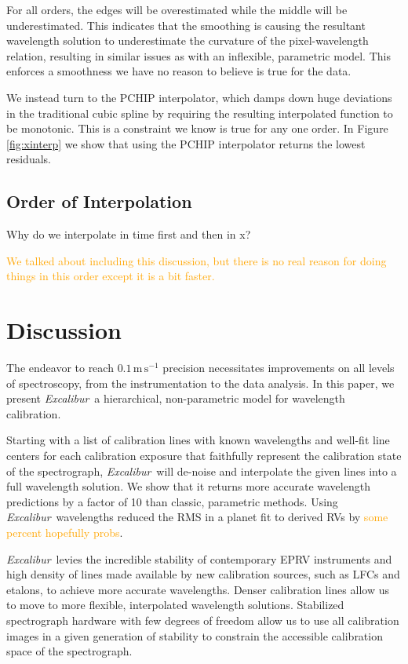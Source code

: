 \documentclass[twocolumn]{aastex63}
\newcommand{\lz}[1]{\textcolor{orange}{#1}}
\newcommand{\project}[1]{\textsl{#1}}
\newcommand{\name}{\project{Excalibur}}
\newcommand{\mps}{\mathrm{m\,s^{-1}}}
\begin{document}
For all orders, the edges will be overestimated while the middle will be underestimated.  This indicates that the smoothing is causing the resultant wavelength solution to underestimate the curvature of the pixel-wavelength relation, resulting in similar issues as with an inflexible, parametric model.  This enforces a smoothness we have no reason to believe is true for the data.

We instead turn to the PCHIP interpolator, which damps down huge deviations in the traditional cubic spline by requiring the resulting interpolated function to be monotonic.  This is a constraint we know is true for any one order.  In Figure \ref{fig:xinterp} we show that using the PCHIP interpolator returns the lowest residuals.

\subsection{Order of Interpolation}
Why do we interpolate in time first and then in x?

\lz{We talked about including this discussion, but there is no real reason for doing things in this order except it is a bit faster.}


\section{Discussion} \label{sec:discussion}
The endeavor to reach $0.1\,\mps$ precision necessitates improvements on all levels of spectroscopy, from the instrumentation to the data analysis.  In this paper, we present \name\, a hierarchical, non-parametric model for wavelength calibration.  

Starting with a list of calibration lines with known wavelengths and well-fit line centers for each calibration exposure that faithfully represent the calibration state of the spectrograph, \name\ will de-noise and interpolate the given lines into a full wavelength solution.  We show that it returns more accurate wavelength predictions by a factor of 10 than classic, parametric methods.  Using \name\ wavelengths reduced the RMS in a planet fit to derived RVs by \lz{some percent hopefully probs}.

\name\ levies the incredible stability of contemporary EPRV instruments and high density of lines made available by new calibration sources, such as LFCs and etalons, to achieve more accurate wavelengths.  Denser calibration lines allow us to move to more flexible, interpolated wavelength solutions.  Stabilized spectrograph hardware with few degrees of freedom allow us to use all calibration images in a given generation of stability to constrain the accessible calibration space of the spectrograph.
\end{document}
